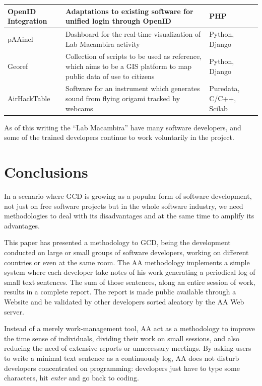 \documentclass[letterpaper]{article}
\begin{document}
\begin{table}
\begin{tabular}{|l|p{5cm}|l|}
        \hline
        OpenID Integration & Adaptations to existing software for
        unified login through OpenID & PHP \\
        \hline
        pAAinel & Dashboard for the real-time visualization of Lab
        Macambira activity & Python, Django \\
        \hline
        Georef & Collection of scripts to be used as reference, which
        aims to be a GIS platform to map public data of use to
        citizens & Python, Django \\
        \hline
        AirHackTable & Software for an instrument which generates
        sound from flying origami tracked by webcams & Puredata,
        C/C++, Scilab \\
        \hline
        \end{tabular}
    \label{tabela:criados}
\end{table}

As of this writing the ``Lab Macambira'' have many software
developers, and some of the trained developers continue to work
voluntarily in the project.

\section{Conclusions}
\label{conclusions}

In a scenario where GCD is growing as a popular form of software
development, not just on free software projects but in the whole
software industry, we need methodologies to deal with its
disadvantages and at the same time to amplify its advantages.

This paper has presented a methodology to GCD, being the development
conducted on large or small groups of software developers, working on
different countries or even at the same room. The AA methodology
implements a simple system where each developer take notes of his work
generating a periodical log of small text sentences. The sum of those
sentences, along an entire session of work, results in a complete
report. The report is made public available through a Website and be
validated by other developers sorted aleatory by the AA Web server.

Instead of a merely work-management tool, AA act as a methodology to
improve the time sense of individuals, dividing their work on small
sessions, and also reducing the need of extensive
reports or unnecessary meetings. By asking users to write a minimal
text sentence as a continuously log, AA does not disturb developers
concentrated on programming: developers just have to type some
characters, hit \textit{enter} and go back to coding.
\end{document}
